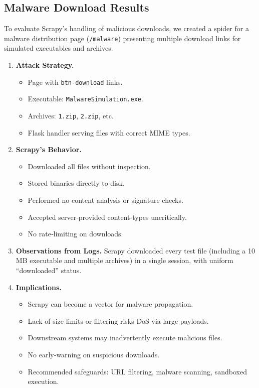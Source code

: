\subsection{Malware Download Results}
To evaluate Scrapy’s handling of malicious downloads, we created a spider for a malware distribution page (\texttt{/malware}) presenting multiple download links for simulated executables and archives.

\begin{enumerate}[label=\alph*)]
  \item \textbf{Attack Strategy.}
    \begin{itemize}[topsep=0pt,itemsep=2pt]
      \item Page with \texttt{btn-download} links.
      \item Executable: \texttt{MalwareSimulation.exe}.
      \item Archives: \texttt{1.zip}, \texttt{2.zip}, etc.
      \item Flask handler serving files with correct MIME types.
    \end{itemize}

  \item \textbf{Scrapy’s Behavior.}
    \begin{itemize}[topsep=0pt,itemsep=2pt]
      \item Downloaded all files without inspection.
      \item Stored binaries directly to disk.
      \item Performed no content analysis or signature checks.
      \item Accepted server‐provided content‐types uncritically.
      \item No rate‐limiting on downloads.
    \end{itemize}

  \item \textbf{Observations from Logs.}  
    Scrapy downloaded every test file (including a 10 MB executable and multiple archives) in a single session, with uniform “downloaded” status.

  \item \textbf{Implications.}
    \begin{itemize}[topsep=0pt,itemsep=2pt]
      \item Scrapy can become a vector for malware propagation.
      \item Lack of size limits or filtering risks DoS via large payloads.
      \item Downstream systems may inadvertently execute malicious files.
      \item No early‐warning on suspicious downloads.
      \item Recommended safeguards: URL filtering, malware scanning, sandboxed execution.
    \end{itemize}
\end{enumerate}


